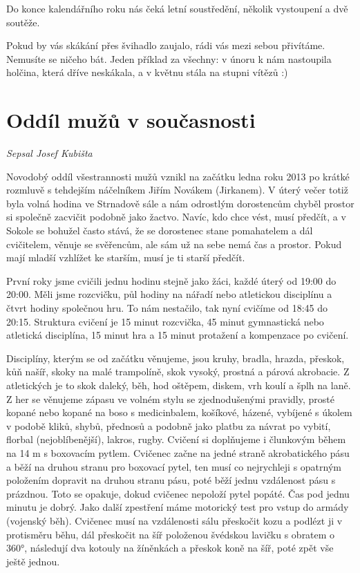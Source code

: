 Do konce kalendářního roku nás čeká letní soustředění, několik
vystoupení a dvě soutěže.

Pokud by vás skákání přes švihadlo zaujalo, rádi vás mezi sebou
přivítáme. Nemusíte se ničeho bát. Jeden příklad za všechny: v únoru k
nám nastoupila holčina, která dříve neskákala, a v květnu stála na
stupni vítězů :)

\section{Oddíl mužů v
současnosti}\label{odduxedl-muux17eux16f-v-souux10dasnosti}

\emph{Sepsal Josef Kubišta}

Novodobý oddíl všestrannosti mužů vznikl na začátku ledna roku 2013 po
krátké rozmluvě s tehdejším náčelníkem Jiřím Novákem (Jirkanem). V úterý
večer totiž byla volná hodina ve Strnadově sále a nám odrostlým
dorostencům chyběl prostor si společně zacvičit podobně jako žactvo.
Navíc, kdo chce vést, musí předčít, a v Sokole se bohužel často stává,
že se dorostenec stane pomahatelem a dál cvičitelem, věnuje se
svěřencům, ale sám už na sebe nemá čas a prostor. Pokud mají mladší
vzhlížet ke starším, musí je ti starší předčít.

První roky jsme cvičili jednu hodinu stejně jako žáci, každé úterý od
19:00 do 20:00. Měli jsme rozcvičku, půl hodiny na nářadí nebo
atletickou disciplínu a čtvrt hodiny společnou hru. To nám nestačilo,
tak nyní cvičíme od 18:45 do 20:15. Struktura cvičení je 15 minut
rozcvička, 45 minut gymnastická nebo atletická disciplína, 15 minut hra
a 15 minut protažení a kompenzace po cvičení.

Disciplíny, kterým se od začátku věnujeme, jsou kruhy, bradla, hrazda,
přeskok, kůň našíř, skoky na malé trampolíně, skok vysoký, prostná a
párová akrobacie. Z atletických je to skok daleký, běh, hod oštěpem,
diskem, vrh koulí a šplh na laně. Z her se věnujeme zápasu ve volném
stylu se zjednodušenými pravidly, prosté kopané nebo kopané na boso s
medicinbalem, košíkové, házené, vybíjené s úkolem v podobě kliků, shybů,
přednosů a podobně jako platbu za návrat po vybití, florbal
(nejoblíbenější), lakros, rugby. Cvičení si doplňujeme i člunkovým během
na 14 m s boxovacím pytlem. Cvičenec začne na jedné straně akrobatického
pásu a běží na druhou stranu pro boxovací pytel, ten musí co nejrychleji
s opatrným položením dopravit na druhou stranu pásu, poté běží jednu
vzdálenost pásu s prázdnou. Toto se opakuje, dokud cvičenec nepoloží
pytel popáté. Čas pod jednu minutu je dobrý. Jako další zpestření máme
motorický test pro vstup do armády (vojenský běh). Cvičenec musí na
vzdálenosti sálu přeskočit kozu a podlézt ji v protisměru běhu, dál
přeskočit na šíř položenou švédskou lavičku s obratem o 360°, následují
dva kotouly na žíněnkách a přeskok koně na šíř, poté zpět vše ještě
jednou.

